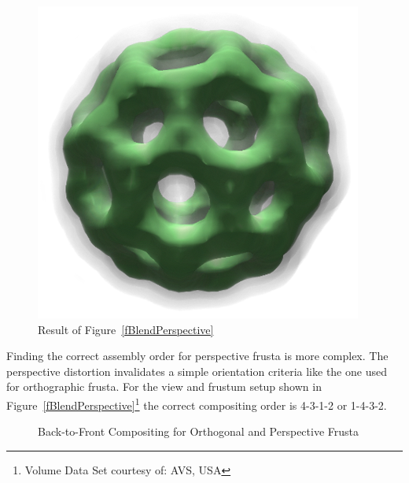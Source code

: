 \documentclass[10pt,a4]{scrartcl}
\newcommand{\fig}[1]{Figure~\ref{#1}}
\begin{document}
\begin{figure}
  \includegraphics[width=.382\textwidth]{images/volResult.png}
  {\caption{\label{fVolResult}Result of \fig{fBlendPerspective}}}
\end{figure}
Finding the correct assembly order for perspective frusta is more
complex. The perspective distortion invalidates a simple orientation
criteria like the one used for orthographic frusta. For the view and
frustum setup shown in \fig{fBlendPerspective}\footnote{Volume Data Set
  courtesy of: AVS, USA} the correct compositing order is 4-3-1-2 or
1-4-3-2.

\begin{figure}[h!t]
  \hfil
  {\caption{\label{fBlend}Back-to-Front Com\-po\-siting for
      Orthogonal and Perspective Frusta}}
\end{figure}
\end{document}
